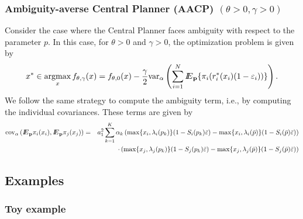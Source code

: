 \subsubsection{Ambiguity-averse Central Planner (AACP) $(\theta>0,\gamma>0)$}
Consider the case where the Central Planner faces ambiguity with respect to the parameter $p$.  In this case, for $\theta>0$ and $\gamma>0$, the optimization problem is given by
\begin{equation}\label{eq:aacp}
x^*\in\mathop{\rm argmax}_{x}  f_{\theta,\gamma}(x)= f_{\theta,0}(x) - \frac{\gamma}{2}{\mathop{\rm var}\nolimits}_{\alpha} \left(\sum_{i=1}^N {I\kern-.35em E}_{\bf p}\{\pi_i(r^*_i(x_i)(1-\varepsilon_i))\}\right).
\end{equation}
We follow the same strategy to compute the ambiguity term, i.e., by computing the individual covariances.  These terms are given by 
\begin{eqnarray*}
{\mathop{\rm cov}\nolimits}_\alpha\left({I\kern-.35em E}_{\bf p}\pi_i(x_i),{I\kern-.35em E}_{\bf p}\pi_j(x_j)\right)&=&a_1^2\sum_{k=1}^K \alpha_k \left(\max\{x_i,\lambda_i(p_k)\}(1-S_i(p_k)\bar{\varepsilon}) - \max\{x_i,\lambda_i(\bar{p})\}(1-S_i(\bar{p})\bar{\varepsilon}) \right)\\
&&\quad\quad\cdot\left(\max\{x_j,\lambda_j(p_k)\}(1-S_j(p_k)\bar{\varepsilon}) - \max\{x_j,\lambda_j(\bar{p})\}(1-S_j(\bar{p})\bar{\varepsilon}) \right)\\
\end{eqnarray*} 

\subsection{Examples}
\subsubsection{Toy example}
\subsubsection{}